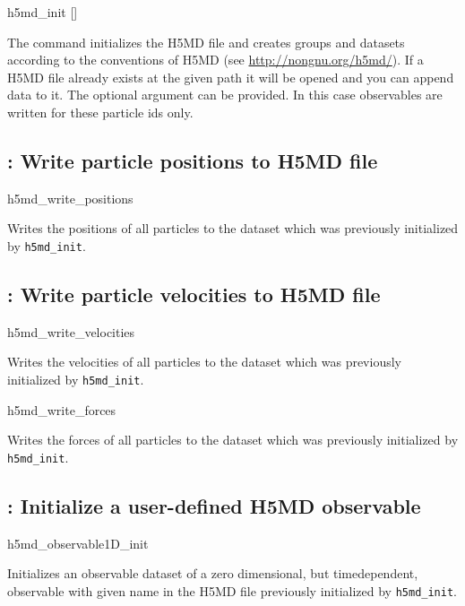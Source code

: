 \begin{essyntax}
h5md_init  []
\end{essyntax}
The  command initializes the H5MD file and creates 
groups and datasets according to the conventions of H5MD (see
\url{http://nongnu.org/h5md/}). If a H5MD file already exists at the given
path it will be opened and you can append data to it. The optional argument 
 can be provided. In this case observables are written 
for these particle ids only.

\subsection{: Write particle positions to H5MD
file}

\begin{essyntax}
h5md_write_positions
\end{essyntax}
Writes the positions of all particles to the dataset which was previously 
initialized by \texttt{h5md_init}.

\subsection{: Write particle velocities to H5MD
file}

\begin{essyntax}
h5md_write_velocities
\end{essyntax}
Writes the velocities of all particles to the dataset which was previously 
initialized by \texttt{h5md_init}.

\begin{essyntax}
h5md_write_forces
\end{essyntax}
Writes the forces of all particles to the dataset which was previously 
initialized by \texttt{h5md_init}.

\subsection{: Initialize a user-defined H5MD
observable}

\begin{essyntax}
h5md_observable1D_init 
\end{essyntax}
Initializes an observable dataset of a zero dimensional, but timedependent, 
observable with given name in the H5MD file previously
initialized by \texttt{h5md_init}.

